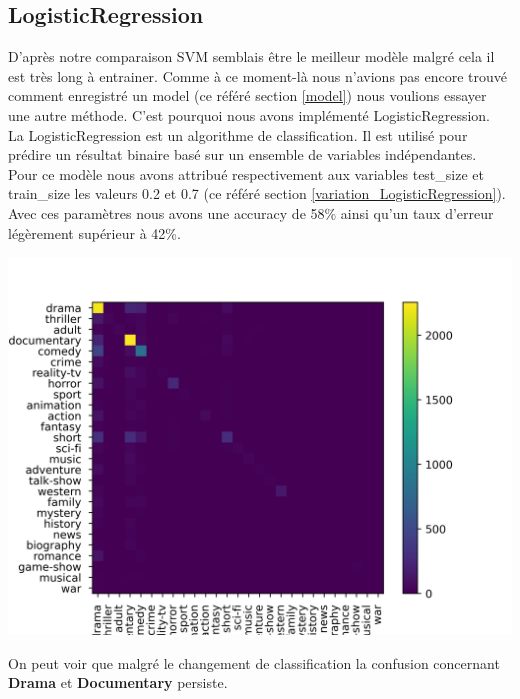 \newpage
\subsection{LogisticRegression}

D'après notre comparaison SVM semblais être le meilleur modèle malgré cela il est très long à entrainer. Comme à ce moment-là nous n'avions pas encore trouvé comment enregistré un model (ce référé section \ref{model}) nous voulions essayer une autre méthode. C’est pourquoi nous avons implémenté LogisticRegression.\\
La LogisticRegression est un algorithme de classification. Il est utilisé pour prédire un résultat binaire basé sur un ensemble de variables indépendantes.\\



Pour ce modèle nous avons attribué respectivement aux variables test\_size et train\_size les valeurs 0.2 et 0.7 (ce référé section \ref{variation_LogisticRegression}). Avec ces paramètres nous avons une accuracy de 58\% ainsi qu'un taux d'erreur légèrement supérieur à 42\%.

\begin{center}
    \includegraphics[scale=1]{graphs/confusion_matrix_LogisticRegression().png}
\end{center}
On peut voir que malgré le changement de classification la confusion concernant \textbf{Drama} et \textbf{Documentary} persiste. 
















